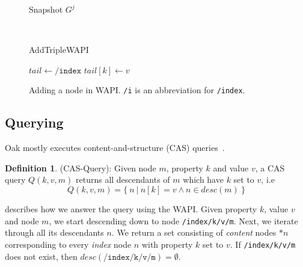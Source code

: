\documentclass[abstracton,12pt]{scrartcl}
\theoremstyle{definition}
\newtheorem{definition}{Definition}
\begin{document}
\begin{figure}[h]
\begin{multicols}{2}
\begin{scriptsize}
\begin{multicols}{2}
\begin{center}
                        Snapshot $G^j$
                    \end{center}    
                \end{multicols}
            \end{scriptsize}
            \columnbreak
            ~

            \vspace{7.8mm}
            \begin{algorithm}[H]
                \label{algo:add_triple_wapi}
                \caption{AddTripleWAPI}
                \DontPrintSemicolon
                \begin{footnotesize}
                    \vspace{2.6mm}
                    $tail \longleftarrow \texttt{/index}$\;
                    $tail[k] \longleftarrow v$
                \end{footnotesize}
            \end{algorithm}
        \end{multicols}
    \vspace{-8mm}
    \caption{Adding a node in WAPI. \texttt{/i} is an abbreviation for \texttt{/index}.}
    \label{fig:add_wapi}
\end{figure}

\newpage

\subsection{Querying}

Oak mostly executes content-and-structure (CAS) queries~\cite{CM15}.

\begin{definition}
    (CAS-Query): Given node $m$, property $k$ and value $v$, a CAS query $Q(k,v,m)$ returns all descendants of $m$ which have $k$ set to $v$, i.e 
    $$ Q(k,v,m) = \{~n~|~n[k] = v \land n \in desc(m)~\}$$
\end{definition}

 describes how we answer the query using the WAPI.
Given property $k$, value $v$ and node $m$, we start descending down to node \texttt{/index/k/v/m}.
Next, we iterate through all its descendants $n$.
We return a set consisting of \textit{content} nodes $*n$ corresponding to every \textit{index} node $n$ with property $k$ set to $v$.
If \texttt{/index/k/v/m} does not exist, then $desc(\texttt{/index/k/v/m}) = \emptyset$.
\end{document}
